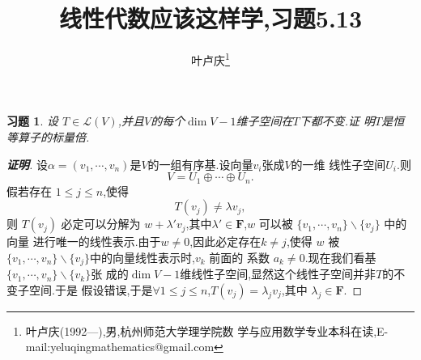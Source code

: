 ﻿\documentclass[a4paper]{article}
\newtheorem*{exa}{习题}
\newenvironment{example}
{\bigskip\begin{mdframed}\begin{exa}}
    {\end{exa}\end{mdframed}\bigskip}
\begin{document}
\title{\huge{\bf{线性代数应该这样学,习题5.13}}}
\author{\small{叶卢庆\footnote{叶卢庆(1992---),男,杭州师范大学理学院数
      学与应用数学专业本科在读,E-mail:yeluqingmathematics@gmail.com}}}
\maketitle\ni
\begin{example}
设 $T\in \mathcal{L}(V)$,并且$V$的每个$\dim V-1$维子空间在$T$下都不变.证
明$T$是恒等算子的标量倍.
\end{example}
\begin{proof}[\textbf{证明}]
设$\alpha=(v_1,\cdots,v_n)$是$V$的一组有序基.设向量$v_i$张成$V$的一维
线性子空间$U_i$.则
$$
V=U_1\oplus\cdots\oplus U_n.
$$
假若存在 $1\leq j\leq n$,使得
$$
T(v_j)\neq \lambda v_j,
$$
则 $T(v_j)$ 必定可以分解为 $w+\lambda' v_j$,其中$\lambda'\in
\mathbf{F}$,$w$ 可以被 $\{v_1,\cdots,v_n\}\backslash \{v_j\}$ 中的向量
进行唯一的线性表示.由于$w\neq 0$,因此必定存在$k\neq j$,使得 $w$ 被
$\{v_1,\cdots,v_n\}\backslash \{v_j\}$中的向量线性表示时,$v_k$ 前面的
系数 $a_k\neq 0$.现在我们看基$\{v_1,\cdots,v_n\}\backslash \{v_k\}$张
成的$\dim V-1$维线性子空间,显然这个线性子空间并非$T$的不变子空间.于是
假设错误,于是$\forall 1\leq j\leq n$,$T(v_j)=\lambda_j v_j $,其中
$\lambda_j\in \mathbf{F}$.
\end{proof}
\end{document}
